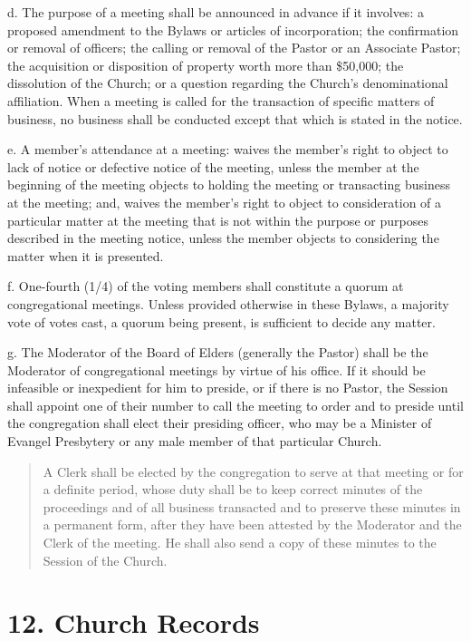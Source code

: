\documentclass[
]{book}
\begin{document}
d. The purpose of a meeting shall be announced in advance if it involves: a proposed amendment to the Bylaws or articles of incorporation; the confirmation or removal of officers; the calling or removal of the Pastor or an Associate Pastor; the acquisition or disposition of property worth more than \$50,000; the dissolution of the Church; or a question regarding the Church's denominational affiliation. When a meeting is called for the transaction of specific matters of business, no business shall be conducted except that which is stated in the notice.

e. A member's attendance at a meeting: waives the member's right to object to lack of notice or defective notice of the meeting, unless the member at the beginning of the meeting objects to holding the meeting or transacting business at the meeting; and, waives the member's right to object to consideration of a particular matter at the meeting that is not within the purpose or purposes described in the meeting notice, unless the member objects to considering the matter when it is presented.

f. One-fourth (1/4) of the voting members shall constitute a quorum at congregational meetings. Unless provided otherwise in these Bylaws, a majority vote of votes cast, a quorum being present, is sufficient to decide any matter.

g. The Moderator of the Board of Elders (generally the Pastor) shall be the Moderator of congregational meetings by virtue of his office. If it should be infeasible or inexpedient for him to preside, or if there is no Pastor, the Session shall appoint one of their number to call the meeting to order and to preside until the congregation shall elect their presiding officer, who may be a Minister of Evangel Presbytery or any male member of that particular Church.

\begin{quote}
A Clerk shall be elected by the congregation to serve at that meeting or for a definite period, whose duty shall be to keep correct minutes of the proceedings and of all business transacted and to preserve these minutes in a permanent form, after they have been attested by the Moderator and the Clerk of the meeting. He shall also send a copy of these minutes to the Session of the Church.
\end{quote}

\hypertarget{church-records}{%
\section{12. Church Records}\label{church-records}}
\end{document}
